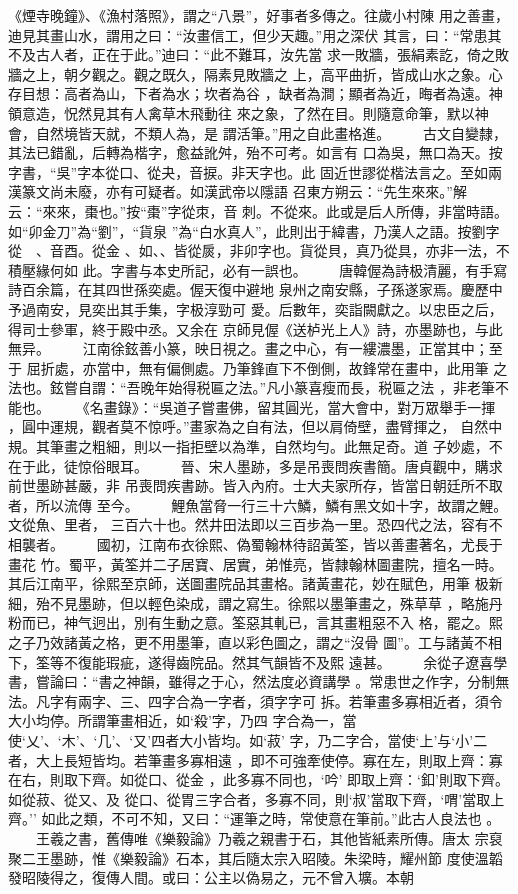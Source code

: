 \documentclass{ctexart}
\begin{document}
《煙寺晚鐘》、《漁村落照》，謂之``八景''，好事者多傳之。往歲小村陳 用之善畫，迪見其畫山水，謂用之曰：``汝畫信工，但少天趣。''用之深伏 其言，曰：``常患其不及古人者，正在于此。''迪曰：``此不難耳，汝先當 求一敗牆，張絹素訖，倚之敗牆之上，朝夕觀之。觀之既久，隔素見敗牆之 上，高平曲折，皆成山水之象。心存目想：高者為山，下者為水；坎者為谷 ，缺者為澗；顯者為近，晦者為遠。神領意造，怳然見其有人禽草木飛動往 來之象，了然在目。則隨意命筆，默以神會，自然境皆天就，不類人為，是 謂活筆。''用之自此畫格進。 　　古文自變隸，其法已錯亂，后轉為楷字，愈益訛舛，殆不可考。如言有 口為吳，無口為天。按字書，``吳''字本從口、從夬，音捩。非天字也。此 固近世謬從楷法言之。至如兩漢篆文尚未廢，亦有可疑者。如漢武帝以隱語 召東方朔云：``先生來來。''解云：``來來，棗也。''按``棗''字從朿，音 刺。不從來。此或是后人所傳，非當時語。如``卯金刀''為``劉''，``貨泉 ''為``白水真人''，此則出于緯書，乃漢人之語。按劉字從　、音酉。從金 、如、、皆從扊，非卯字也。貨從貝，真乃從具，亦非一法，不積壓緣何如 此。字書与本史所記，必有一誤也。 　　唐韓偓為詩极清麗，有手寫詩百余篇，在其四世孫奕處。偓天復中避地 泉州之南安縣，子孫遂家焉。慶歷中予過南安，見奕出其手集，字极淳勁可 愛。后數年，奕詣闕獻之。以忠臣之后，得司士參軍，終于殿中丞。又余在 京師見偓《送栌光上人》詩，亦墨跡也，与此無异。 　　江南徐鉉善小篆，映日視之。畫之中心，有一縷濃墨，正當其中；至于 屈折處，亦當中，無有偏側處。乃筆鋒直下不倒側，故鋒常在畫中，此用筆 之法也。鉉嘗自謂：``吾晚年始得税匾之法。''凡小篆喜瘦而長，税匾之法 ，非老筆不能也。 　　《名畫錄》：``吳道子嘗畫佛，留其圓光，當大會中，對万眾舉手一揮 ，圓中運規，觀者莫不惊呼。''畫家為之自有法，但以肩倚壁，盡臂揮之， 自然中規。其筆畫之粗細，則以一指拒壁以為準，自然均勻。此無足奇。道 子妙處，不在于此，徒惊俗眼耳。 　　晉、宋人墨跡，多是吊喪問疾書簡。唐貞觀中，購求前世墨跡甚嚴，非 吊喪問疾書跡。皆入內府。士大夫家所存，皆當日朝廷所不取者，所以流傳 至今。 　　鯉魚當脅一行三十六鱗，鱗有黑文如十字，故謂之鯉。文從魚、里者， 三百六十也。然井田法即以三百步為一里。恐四代之法，容有不相襲者。 　　國初，江南布衣徐熙、偽蜀翰林待詔黃筌，皆以善畫著名，尤長于畫花 竹。蜀平，黃筌并二子居寶、居實，弟惟亮，皆隸翰林圖畫院，擅名一時。 其后江南平，徐熙至京師，送圖畫院品其畫格。諸黃畫花，妙在賦色，用筆 极新細，殆不見墨跡，但以輕色染成，謂之寫生。徐熙以墨筆畫之，殊草草 ，略施丹粉而已，神气迥出，別有生動之意。筌惡其軋已，言其畫粗惡不入 格，罷之。熙之子乃效諸黃之格，更不用墨筆，直以彩色圖之，謂之``沒骨 圖''。工与諸黃不相下，筌等不復能瑕疵，遂得齒院品。然其气韻皆不及熙 遠甚。 　　余從子遼喜學書，嘗論曰：``書之神韻，雖得之于心，然法度必資講學 。常患世之作字，分制無法。凡字有兩字、三、四字合為一字者，須字字可 拆。若筆畫多寡相近者，須令大小均停。所謂筆畫相近，如`殺'字，乃四 字合為一，當使`乂'、`木'、`几'、`又'四者大小皆均。如`菽' 字，乃二字合，當使`上'与`小'二者，大上長短皆均。若筆畫多寡相遠 ，即不可強牽使停。寡在左，則取上齊：寡在右，則取下齊。如從口、從金 ，此多寡不同也，`吟' 即取上齊：`釦'則取下齊。如從菽、從又、及 從口、從胃三字合者，多寡不同，則`叔'當取下齊，`喟'當取上齊。'' 如此之類，不可不知，又曰：``運筆之時，常使意在筆前。''此古人良法也 。 　　王羲之書，舊傳唯《樂毅論》乃羲之親書于石，其他皆紙素所傳。唐太 宗裒聚二王墨跡，惟《樂毅論》石本，其后隨太宗入昭陵。朱梁時，耀州節 度使溫韜發昭陵得之，復傳人間。或曰：公主以偽易之，元不曾入壙。本朝 
\end{document}
